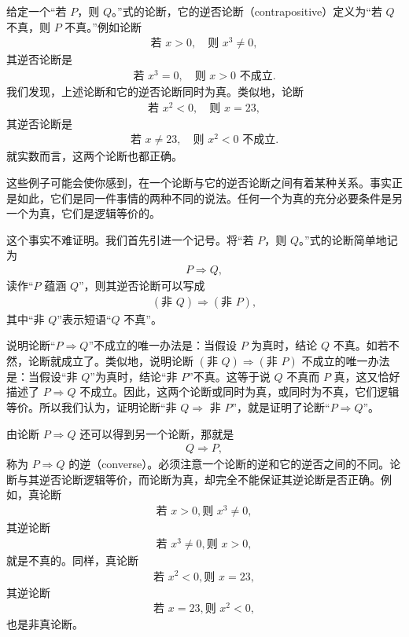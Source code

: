 \documentclass[../../main.tex]{subfiles}
\begin{document}
给定一个“若 $P$，则 $Q$。”式的论断，它的逆否论断（contrapositive）定义为“若 $Q$ 不真，则 $P$ 不真。”例如论断
\begin{align*}
\text{若 } x > 0, \quad \text{则 } x^{3} \neq 0,
\end{align*}
其逆否论断是
\begin{align*}
\text{若 } x^{3} = 0, \quad \text{则 } x > 0 \text{ 不成立}.
\end{align*}
我们发现，上述论断和它的逆否论断同时为真。类似地，论断
\begin{align*}
\text{若 } x^{2} < 0, \quad \text{则 } x = 23,
\end{align*}
其逆否论断是
\begin{align*}
\text{若 } x \neq 23, \quad \text{则 } x^{2} < 0 \text{ 不成立}.
\end{align*}
就实数而言，这两个论断也都正确。

这些例子可能会使你感到，在一个论断与它的逆否论断之间有着某种关系。事实正是如此，它们是同一件事情的两种不同的说法。任何一个为真的充分必要条件是另一个为真，它们是逻辑等价的。

这个事实不难证明。我们首先引进一个记号。将“若 $P$，则 $Q$。”式的论断简单地记为
\begin{align*}
P \Longrightarrow Q,
\end{align*}
读作“$P$ 蕴涵 $Q$”，则其逆否论断可以写成
\begin{align*}
(\text{非 } Q) \Longrightarrow (\text{非 } P),
\end{align*}
其中“非 $Q$”表示短语“$Q$ 不真”。

说明论断“$P \Longrightarrow Q$”不成立的唯一办法是：当假设 $P$ 为真时，结论 $Q$ 不真。如若不然，论断就成立了。类似地，说明论断 $(\text{非 } Q) \Longrightarrow (\text{非 } P)$ 不成立的唯一办法是：当假设“非 $Q$”为真时，结论“非 $P$”不真。这等于说 $Q$ 不真而 $P$ 真，这又恰好描述了 $P \Longrightarrow Q$ 不成立。因此，这两个论断或同时为真，或同时为不真，它们逻辑等价。所以我们认为，证明论断“非 $Q \Longrightarrow$ 非 $P$”，就是证明了论断“$P \Longrightarrow Q$”。

由论断 $P \Longrightarrow Q$ 还可以得到另一个论断，那就是
\begin{align*}
Q \Longrightarrow P,
\end{align*}
称为 $P \Longrightarrow Q$ 的逆（converse）。必须注意一个论断的逆和它的逆否之间的不同。论断与其逆否论断逻辑等价，而论断为真，却完全不能保证其逆论断是否正确。例如，真论断
\begin{align*}
\text{若 } x > 0, \text{则 } x^{3} \neq 0,
\end{align*}
其逆论断
\begin{align*}
\text{若 } x^{3} \neq 0, \text{则 } x > 0,
\end{align*}
就是不真的。同样，真论断
\begin{align*}
\text{若 } x^{2} < 0, \text{则 } x = 23,
\end{align*}
其逆论断
\begin{align*}
\text{若 } x = 23, \text{则 } x^{2} < 0,
\end{align*}
也是非真论断。
\end{document}
